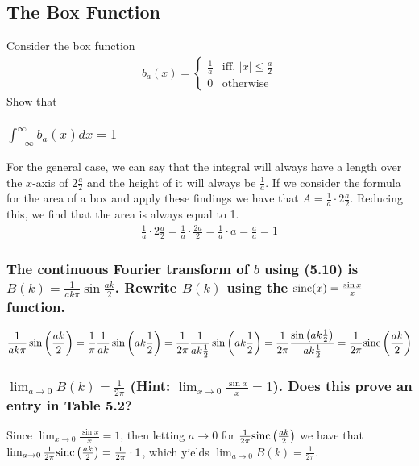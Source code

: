 \subsection{The Box Function}
Consider the box function
\begin{align}
    b_a(x) =
    \begin{cases}
        \frac{1}{a}     & \mbox{iff. $|x| \leq \frac{a}{2}$} \\
        0               & \mbox{otherwise}
    \end{cases}
\end{align}
Show that

\subsubsection{\mdseries $\int_{-\infty}^{\infty} b_a(x) dx = 1$}
For the general case, we can say that the integral will always have a length
over the $x$-axis of $2 \frac{a}{2}$ and the height of it will always be
$\frac{1}{a}$. If we consider the formula for the area of a box and apply
these findings we have that $A = \frac{1}{a} \cdot 2 \frac{a}{2}$. Reducing
this, we find that the area is always equal to 1.
\begin{align}
    \frac{1}{a} \cdot 2 \frac{a}{2}
    = \frac{1}{a} \cdot \frac{2a}{2}
    = \frac{1}{a} \cdot a
    = \frac{a}{a}
    = 1
\end{align}

\subsubsection{\mdseries The continuous Fourier transform of $b$ using (5.10)
is $B(k) = \frac{1}{ak\pi} \sin \frac{ak}{2}$. Rewrite $B(k)$ using the
$\textnormal{sinc}(x) = \frac{\sin x}{x}$ function.}
\begin{align}
    \frac{1}{ak\pi} \sin \left( \frac{ak}{2} \right)
    = \frac{1}{\pi} \frac{1}{ak} \sin \left( ak \frac{1}{2} \right)
    = \frac{1}{2\pi} \frac{1}{ak \frac{1}{2} } \sin \left( ak \frac{1}{2} \right)
    = \frac{1}{2\pi} \frac{ \sin \left( ak \frac{1}{2} \right) }{ak \frac{1}{2} }
    = \frac{1}{2\pi} \textnormal{sinc} \left( \frac{ak}{2} \right)
\end{align}

\subsubsection{\mdseries $\lim_{a \rightarrow 0} B(k) = \frac{1}{2\pi}$ (Hint:
$\lim_{x \rightarrow 0} \frac{\sin x}{x} = 1$). Does this prove an entry in
Table 5.2?}
Since $\lim_{x \rightarrow 0} \frac{\sin x}{x} = 1$, then letting $a
\rightarrow 0$ for $\frac{1}{2\pi} \textnormal{sinc} \left( \frac{ak}{2} \right)$ we have
that $\lim_{a \rightarrow 0} \frac{1}{2\pi} \textnormal{sinc} \left( \frac{ak}{2} \right)
= \frac{1}{2\pi} \cdot 1$, which yields $\lim_{a \rightarrow 0} B(k) =
\frac{1}{2\pi}$.

